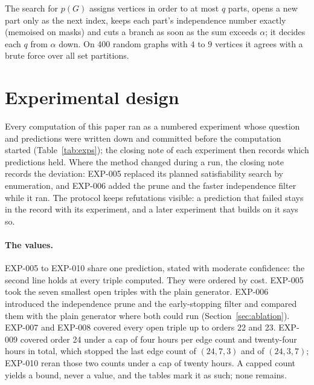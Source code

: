\documentclass[11pt]{article}
\theoremstyle{definition}
\theoremstyle{remark}
\begin{document}
The search for $p(G)$ assigns vertices in order to at most $q$ parts, opens a new part only as the next index, keeps
each part's independence number exactly (memoised on masks) and cuts a branch as soon as the sum exceeds $\alpha$; it
decides each $q$ from $\alpha$ down. On 400 random graphs with $4$ to $9$ vertices it agrees with a brute force over all
set partitions.

\section{Experimental design}\label{sec:design}

Every computation of this paper ran as a numbered experiment whose question and predictions were written down
and committed before the computation started (Table~\ref{tab:exps}); the closing note of each experiment then records
which predictions held. Where the method changed during a run, the closing note records the deviation: EXP-005
replaced its planned satisfiability search by enumeration, and EXP-006 added the prune and the faster independence
filter while it ran. The protocol keeps refutations visible: a prediction that failed stays in the record with its
experiment, and a later experiment that builds on it says so.

\paragraph{The values.} EXP-005 to EXP-010 share one prediction, stated with moderate confidence: the second line
holds at every triple computed. They were ordered by cost. EXP-005 took the seven smallest open triples with the plain
generator. EXP-006 introduced the independence prune and the early-stopping filter and compared them with the plain
generator where both could run (Section~\ref{sec:ablation}). EXP-007 and EXP-008 covered every open triple up to orders
22 and 23. EXP-009 covered order 24 under a cap of four hours per edge count and twenty-four hours in total, which
stopped the last edge count of $(24,7,3)$ and of $(24,3,7)$; EXP-010 reran those two counts under a cap of twenty
hours. A capped count yields a bound, never a value, and the tables mark it as such; none remains.
\end{document}
